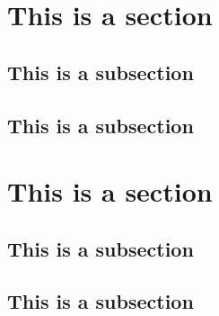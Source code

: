 \documentclass[11pt,oneside]{book}
\begin{document}
\section{This is a section}
\subsection{This is a subsection}
\lipsum[1-3]

\subsection{This is a subsection}
\lipsum[1-2]

\section{This is a section}
\subsection{This is a subsection}
\lipsum[1-1]
\subsection{This is a subsection}
\lipsum[1-2]
\end{document}
